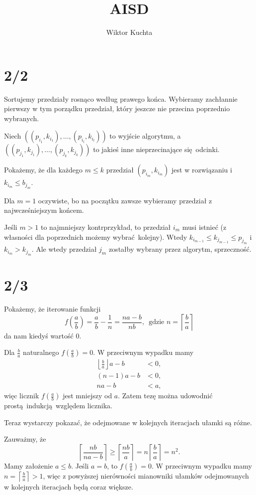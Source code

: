 \documentclass[a4paper, 12pt]{article}
\title{AISD}
\author{Wiktor Kuchta}
\newcommand{\+}{\enspace}
\begin{document}
\maketitle

\section*{2/2}
Sortujemy przedziały rosnąco według prawego końca.
Wybieramy zachłannie pierwszy w tym porządku przedział,
który jeszcze nie przecina poprzednio wybranych.

Niech $((p_{i_1}, k_{i_1}), …, (p_{i_l}, k_{i_l}))$ to wyjście
algorytmu, a $((p_{j_1}, k_{j_1}), …, (p_{j_k}, k_{j_k}))$ to jakieś
inne nieprzecinające się odcinki.

Pokażemy, że dla każdego $m≤k$
przedział $(p_{i_m}, k_{i_m})$ jest w rozwiązaniu i $k_{i_m} ≤ b_{j_m}$.

Dla $m=1$ oczywiste, bo na początku zawsze wybieramy przedział z najwcześniejszym końcem.

Jeśli $m>1$ to najmniejszy kontrprzykład, to
przedział $i_m$ musi istnieć (z własności dla poprzednich możemy wybrać kolejny).
Wtedy
$k_{i_{m-1}} ≤ k_{j_{m-1}} ≤ p_{j_m}$ i $k_{i_m} > k_{j_m}$.
Ale wtedy przedział $j_m$ zostałby wybrany przez algorytm, sprzeczność.

\section*{2/3}
Pokażemy, że iterowanie funkcji
$$f\left(\frac{a}{b}\right) = \frac{a}{b} - \frac{1}{n} = \frac{na-b}{nb},
\+ \text{gdzie }n = \left\lceil\frac{b}{a}\right\rceil$$
da nam kiedyś wartość $0$.

Dla $\frac{b}{a}$ naturalnego $f\left(\frac{a}{b}\right) = 0$.
W przeciwnym wypadku mamy
\begin{align*}
	\left\lfloor \frac{b}{a} \right\rfloor a - b &< 0, \\
	(n-1)a - b &< 0, \\
	na - b &< a,
\end{align*}
więc licznik $f\left(\frac{a}{b}\right)$ jest mniejszy od $a$.
Zatem tezę można udowodnić prostą indukcją względem licznika.

Teraz wystarczy pokazać, że odejmowane w kolejnych iteracjach
ułamki są różne.

Zauważmy, że
$$
\left\lceil \frac{nb}{na-b} \right\rceil
≥ \left\lceil \frac{nb}{a} \right\rceil
= n \left\lceil \frac{b}{a} \right\rceil = n^2.
$$
Mamy założenie $a≤b$.
Jeśli $a=b$, to $f(\frac{a}{b}) = 0$.
W przeciwnym wypadku mamy $n=\left\lceil \frac{b}{a} \right\rceil > 1$,
więc z powyższej nierówności mianowniki ułamków odejmowanych w kolejnych
iteracjach będą coraz większe.
\end{document}
